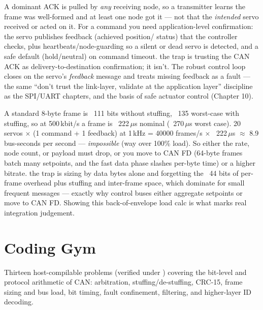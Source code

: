 A dominant ACK is pulled by \emph{any} receiving node, so a transmitter learns
the frame was well-formed and at least one node got it --- not that the
\emph{intended} servo received or acted on it. For a command you need
application-level confirmation: the servo publishes feedback (achieved position/
status) that the controller checks, plus heartbeats/node-guarding so a silent or
dead servo is detected, and a safe default (hold/neutral) on command timeout.
\trap the trap is trusting the CAN ACK as delivery-to-destination confirmation;
it isn't. The robust control loop closes on the servo's \emph{feedback} message
and treats missing feedback as a fault --- the same ``don't trust the
link-layer, validate at the application layer'' discipline as the SPI/UART
chapters, and the basis of safe actuator control (Chapter 10).

A standard 8-byte frame is ~111 bits without stuffing, ~135 worst-case with
stuffing, so at 500\,kbit/s a frame is ~222\,$\mu$s nominal (~270\,$\mu$s worst
case). 20 servos $\times$ (1 command + 1 feedback) at 1\,kHz = 40000 frames/s
$\times$ ~222\,$\mu$s $\approx$ 8.9 bus-seconds per second --- \emph{impossible}
(way over 100\% load). So either the rate, node count, or payload must drop, or
you move to CAN FD (64-byte frames batch many setpoints, and the fast data phase
slashes per-byte time) or a higher bitrate. \trap the trap is sizing by data
bytes alone and forgetting the ~44 bits of per-frame overhead plus stuffing and
inter-frame space, which dominate for small frequent messages --- exactly why
control buses either aggregate setpoints or move to CAN FD. Showing this
back-of-envelope load calc is what marks real integration judgement.

\section{Coding Gym}

\begin{partnote}
Thirteen host-compilable problems (verified under
) covering the bit-level and protocol
arithmetic of CAN: arbitration, stuffing/de-stuffing, CRC-15, frame sizing and
bus load, bit timing, fault confinement, filtering, and higher-layer ID
decoding.
\end{partnote}

